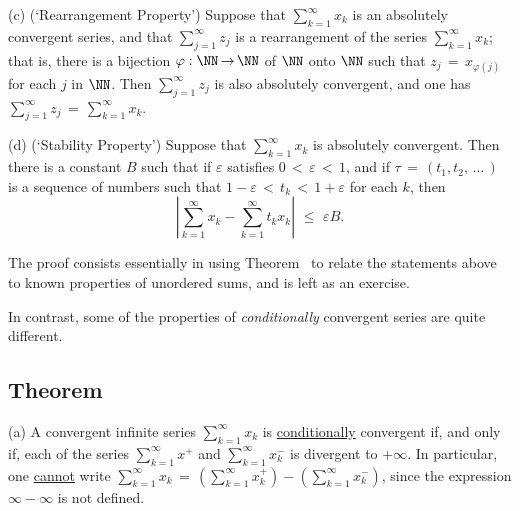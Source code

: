 \V

        (c) (`Rearrangement Property') Suppose that $\sum_{k=1}^{{\infty}} x_{k}$ is an absolutely convergent series,
    and that $\sum_{j=1}^{{\infty}} z_{j}$ is a rearrangement of the series $\sum_{k=1}^{{\infty}} x_{k}$;
    that is, there is a bijection ${\varphi}:{\NN} \,{\rightarrow}\, {\NN}$ of ${\NN}$ onto ${\NN}$ such that $z_{j} \,=\, x_{{\varphi}(j)}$ for each $j$ in ${\NN}$.
    Then $\sum_{j=1}^{{\infty}} z_{j}$ is also absolutely convergent, and one has $\sum_{j=1}^{{\infty}} z_{j} \,=\, \sum_{k=1}^{{\infty}} x_{k}$.

\V

        (d) (`Stability Property') Suppose that $\sum_{k=1}^{{\infty}} x_{k}$ is absolutely convergent.
    Then there is a constant $B$ such that if ${\varepsilon}$ satisfies $0\,<\,{\varepsilon}\,<\,1$,
    and if ${\tau} \,=\, (t_{1},t_{2},\,{\ldots}\,)$ is a sequence of numbers such that $1-{\varepsilon}\,<\,t_{k}\,<\,1+{\varepsilon}$ for each $k$,
    then
        \begin{displaymath}
        \left|\sum_{k=1}^{{\infty}} x_{k} - \sum_{k=1}^{{\infty}} t_{k}x_{k}\right|\,\,{\leq}\,\,{\varepsilon}B.
        \end{displaymath}

\V

        The proof consists essentially in using Theorem~ to relate the statements above to known properties of unordered sums,
    and is left as an exercise.

\V
\V

       In contrast, some of the properties of {\em conditionally} convergent series are quite different.

\V
\V


        \subsection{\small{{\bf Theorem}}}
        \label{ThmG40.60}

\V


        (a) A convergent infinite series $\sum_{k=1}^{{\infty}} x_{k}$ is \underline{conditionally} convergent if, and only if,
    each of the series $\sum_{k=1}^{{\infty}} x^{+}$ and $\sum_{k=1}^{{\infty}} x^{-}_{k}$ is divergent to $+{\infty}$.
    In particular, one \underline{cannot} write $\sum_{k=1}^{{\infty}} x_{k} \,=\, \left(\sum_{k=1}^{{\infty}} x_{k}^{+}\right) - \left(\sum_{k=1}^{{\infty}} x_{k}^{-}\right)$, since the expression ${\infty}-{\infty}$ is not defined.


